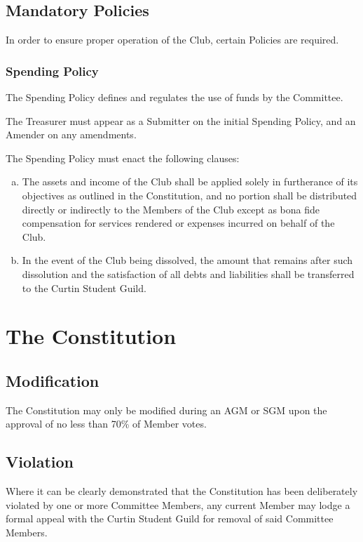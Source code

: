 \documentclass[a4paper,12pt]{article}
\begin{document}
\subsection{Mandatory Policies}

In order to ensure proper operation of the Club, certain Policies are required.

\subsubsection{Spending Policy}

The Spending Policy defines and regulates the use of funds by the Committee.

The Treasurer must appear as a Submitter on the initial Spending Policy, and an Amender on any amendments.

The Spending Policy must enact the following clauses:
\begin{enumerate}[a)]
	\item The assets and income of the Club shall be applied solely in furtherance of its objectives as outlined in the Constitution, and no portion shall be distributed directly or indirectly to the Members of the Club except as bona fide compensation for services rendered or expenses incurred on behalf of the Club.
	\item In the event of the Club being dissolved, the amount that remains after such dissolution and the satisfaction of all debts and liabilities shall be transferred to the Curtin Student Guild.
\end{enumerate}

\section{The Constitution}

\subsection{Modification}

The Constitution may only be modified during an AGM or SGM upon the approval of no less than 70\% of Member votes.

\subsection{Violation}

Where it can be clearly demonstrated that the Constitution has been deliberately violated by one or more Committee Members, any current Member may lodge a formal appeal with the Curtin Student Guild for removal of said Committee Members.
\end{document}
